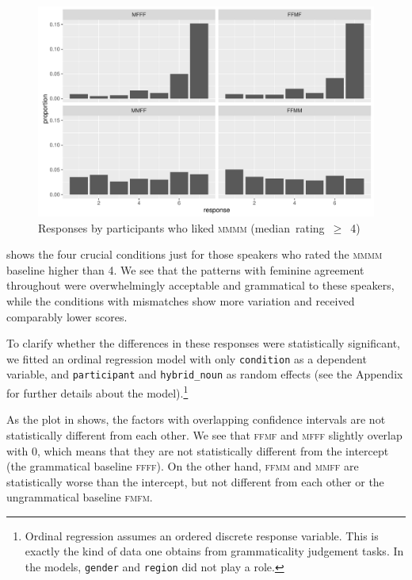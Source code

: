 \documentclass[output=paper,
modfonts,
newtxmath,
hidelinks
]{langscibook}
\begin{document}
\begin{figure}[b]
	\centering
	\includegraphics[height=.35\textheight]{figures/14resps-final.pdf}
	\caption{Responses by participants who liked \textsc{mmmm} \mbox{(median rating $\geq$ 4)\hspace*{-6mm}}}\label{fig:resps-final}
\end{figure}

 shows the four crucial conditions just for those speakers who rated the \textsc{mmmm} baseline higher than 4. We see that the patterns with feminine agreement throughout were overwhelmingly acceptable and grammatical to these speakers, while the conditions with mismatches show more variation and received comparably lower scores.

To clarify whether the differences in these responses  were statistically significant, we fitted an ordinal regression model with only \texttt{condition} as a dependent variable, and \texttt{participant} and \texttt{hybrid\_noun} as random effects (see the Appendix for further details about the model).\footnote{Ordinal regression assumes an ordered discrete response variable. This is exactly the kind of data one obtains from grammaticality judgement tasks. In the models, \texttt{gender} and \texttt{region} did not play a role.}		
 
 
As the plot in  shows, the factors with overlapping confidence intervals are not statistically different from each other. 
 We see that \textsc{ffmf} and \textsc{mfff} slightly overlap with 0, which means that they are not statistically different from the intercept (the grammatical baseline \textsc{ffff}). 		
On the other hand, \textsc{ffmm} and \textsc{mmff} are statistically worse than the intercept, but not different from each other or the ungrammatical baseline \textsc{fmfm}.%
\end{document}
